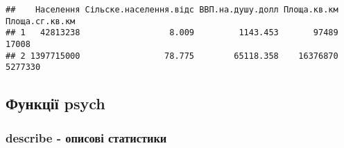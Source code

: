 \documentclass[
]{article}
\newenvironment{Shaded}{\begin{snugshade}}{\end{snugshade}}
\newcommand{\CommentTok}[1]{\textcolor[rgb]{0.56,0.35,0.01}{\textit{#1}}}
\newcommand{\DataTypeTok}[1]{\textcolor[rgb]{0.13,0.29,0.53}{#1}}
\newcommand{\KeywordTok}[1]{\textcolor[rgb]{0.13,0.29,0.53}{\textbf{#1}}}
\newcommand{\NormalTok}[1]{#1}
\newcommand{\OperatorTok}[1]{\textcolor[rgb]{0.81,0.36,0.00}{\textbf{#1}}}
\newcommand{\OtherTok}[1]{\textcolor[rgb]{0.56,0.35,0.01}{#1}}
\newcommand{\StringTok}[1]{\textcolor[rgb]{0.31,0.60,0.02}{#1}}
\begin{document}
\begin{Shaded}
\end{Shaded}

\begin{verbatim}
##    Населення Сільске.населення.відс ВВП.на.душу.долл Площа.кв.км Площа.сг.кв.км
## 1   42813238                  8.009         1143.453       97489          17008
## 2 1397715000                 78.775        65118.358    16376870        5277330
\end{verbatim}

\hypertarget{ux444ux443ux43dux43aux446ux456ux457-psych}{%
\subsection{Функції
psych}\label{ux444ux443ux43dux43aux446ux456ux457-psych}}

\hypertarget{describe---ux43eux43fux438ux441ux43eux432ux456-ux441ux442ux430ux442ux438ux441ux442ux438ux43aux438}{%
\subsubsection{describe - описові
статистики}\label{describe---ux43eux43fux438ux441ux43eux432ux456-ux441ux442ux430ux442ux438ux441ux442ux438ux43aux438}}
\end{document}
